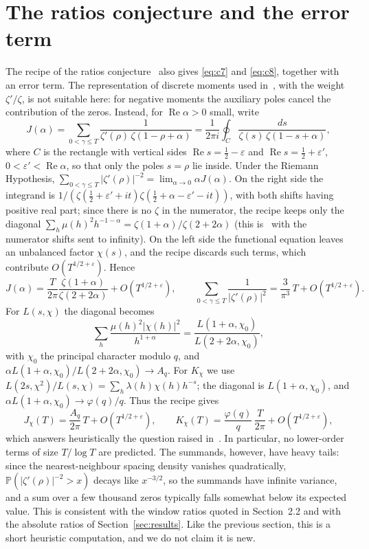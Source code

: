 \documentclass[11pt]{amsart}
\begin{document}
\section{The ratios conjecture and the error term}\label{sec:ratios}

The recipe of the ratios conjecture~\cite{CFZ,CS} also gives \eqref{eq:c7} and \eqref{eq:c8}, together with an error
term. The representation of discrete moments used in~\cite[Section~7]{CS}, with the weight $\zeta'/\zeta$, is not
suitable here: for negative moments the auxiliary poles cancel the contribution of the zeros. Instead, for
$\operatorname{Re}\alpha>0$ small, write
\[
J(\alpha)=\sum_{0<\gamma\le T}\frac{1}{\zeta'(\rho)\,\zeta(1-\rho+\alpha)}=\frac{1}{2\pi i}\oint_{C}\frac{ds}{\zeta(s)\,\zeta(1-s+\alpha)},
\]
where $C$ is the rectangle with vertical sides $\operatorname{Re}s=\frac12-\varepsilon$ and
$\operatorname{Re}s=\frac12+\varepsilon'$, $0<\varepsilon'<\operatorname{Re}\alpha$, so that only the poles $s=\rho$ lie
inside. Under the Riemann Hypothesis, $\sum_{0<\gamma\le T}|\zeta'(\rho)|^{-2}=\lim_{\alpha\to0}\alpha J(\alpha)$. On the
right side the integrand is $1/(\zeta(\frac12+\varepsilon'+it)\zeta(\frac12+\alpha-\varepsilon'-it))$, with both shifts
having positive real part; since there is no $\zeta$ in the numerator, the recipe keeps only the diagonal
$\sum_h\mu(h)^2h^{-1-\alpha}=\zeta(1+\alpha)/\zeta(2+2\alpha)$ (this is~\cite[(2.10)]{CS} with the numerator shifts sent
to infinity). On the left side the functional equation leaves an unbalanced factor $\chi(s)$, and the recipe discards
such terms, which contribute $O(T^{1/2+\varepsilon})$. Hence
\[
J(\alpha)=\frac{T}{2\pi}\frac{\zeta(1+\alpha)}{\zeta(2+2\alpha)}+O(T^{1/2+\varepsilon}),\qquad
\sum_{0<\gamma\le T}\frac{1}{|\zeta'(\rho)|^{2}}=\frac{3}{\pi^{3}}\,T+O(T^{1/2+\varepsilon}).
\]
For $L(s,\chi)$ the diagonal becomes
\[
\sum_h\frac{\mu(h)^2|\chi(h)|^2}{h^{1+\alpha}}=\frac{L(1+\alpha,\chi_0)}{L(2+2\alpha,\chi_0)},
\]
with $\chi_0$ the principal character modulo $q$, and $\alpha L(1+\alpha,\chi_0)/L(2+2\alpha,\chi_0)\to A_q$. For $K_\chi$ we
use $L(2s,\chi^2)/L(s,\chi)=\sum_h\lambda(h)\chi(h)h^{-s}$; the diagonal is $L(1+\alpha,\chi_0)$, and
$\alpha L(1+\alpha,\chi_0)\to\varphi(q)/q$. Thus the recipe gives
\[
J_\chi(T)=\frac{A_q}{2\pi}\,T+O(T^{1/2+\varepsilon}),\qquad K_\chi(T)=\frac{\varphi(q)}{q}\,\frac{T}{2\pi}+O(T^{1/2+\varepsilon}),
\]
which answers heuristically the question raised in~\cite{PC}. In particular, no lower-order terms of size $T/\log T$ are
predicted. The summands, however, have heavy tails: since the nearest-neighbour spacing density vanishes quadratically,
$\mathbb{P}(|\zeta'(\rho)|^{-2}>x)$ decays like $x^{-3/2}$, so the summands have infinite variance, and a sum over a
few thousand zeros typically falls somewhat below its expected value. This is consistent with the window ratios
quoted in Section~2.2 and with the absolute ratios of Section~\ref{sec:results}. Like the previous section, this is a
short heuristic computation, and we do not claim it is new.
\end{document}
